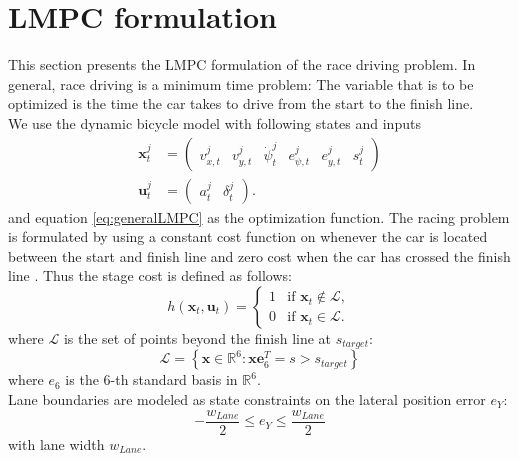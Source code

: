 \section{LMPC formulation}
This section presents the LMPC formulation of the race driving problem. In general, race driving is a minimum time problem: The variable that is to be optimized is the time the car takes to drive from the start to the finish line.\\
We use the dynamic bicycle model with following states and inputs
\begin{align}
\bm{x}_t^j&=\begin{pmatrix}
v_{x,t}^j & v_{y,t}^j & \dot \psi_t^j & e_{\psi,t}^j & e_{y,t}^j & s_t^j
\end{pmatrix}\\
\bm{u}_t^j&=\begin{pmatrix}
a_t^j & \delta_t^j
\end{pmatrix}.
\end{align}
and equation \ref{eq:generalLMPC} as the optimization function.
The racing problem is formulated by using a constant cost function on whenever the car is located between the start and finish line and zero cost when the car has crossed the finish line \cite{Rosolia2016}. Thus the stage cost is defined as follows:
\begin{equation}
h(\bm{x}_t,\bm{u}_t)=\begin{cases}
1&\text{if }\bm{x}_t\not\in\mathcal{L},\\
0&\text{if }\bm{x}_t\in\mathcal{L}.
\end{cases}
\end{equation}
where $\mathcal{L}$ is the set of points beyond the finish line at $s_{target}$:
\begin{equation}
\mathcal{L}=\left\{\bm{x}\in \mathbb{R}^6: \bm{xe}_6^T=s>s_{target}\right\}
\end{equation}
where $e_6$ is the 6-th standard basis in $\mathbb{R}^6$.\\
Lane boundaries are modeled as state constraints on the lateral position error $e_Y$:
\begin{equation}
-\frac{w_{Lane}}{2}\leq e_Y \leq \frac{w_{Lane}}{2}
\end{equation}
with lane width $w_{Lane}$.

